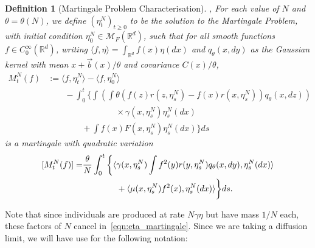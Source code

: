 \documentclass[12pt]{article}
\newtheorem{definition}[theorem]{Definition}
\newcommand{\IR}{\mathbb R}
\newcommand{\meanq}{\vec b}    %
\newcommand{\covq}{C}     %
\newcommand{\measures}{\mathcal{M}_F(\IR^d)} %
\begin{document}
\begin{definition}[Martingale Problem Characterisation]
    \label{defn:mgale_construction},
For each value of $N$ and $\theta = \theta(N)$,
we define $(\eta^N_t)_{t \geq 0}$ to be the solution to the Martingale Problem,
with initial condition $\eta^N_0 \in \measures$,
such that for all smooth functions $f \in C^{\infty}_{0}(\IR^d)$,
writing $\langle f, \eta \rangle = \int_{\IR^d} f(x) \eta(dx)$
and $q_\theta(x, dy)$ as the Gaussian kernel
with mean $x + \meanq(x)/\theta$ and covariance $\covq(x) / \theta$,
\begin{equation}
    \label{eqn:eta_martingale}
\begin{aligned}
M^N_t(f)
&:=  \langle f, \eta^N_t \rangle
        -\langle f, \eta^N_0 \rangle
 \\ &\qquad {}
 -  \int_{0}^{t}\bigg\{
        \int\left( \int \theta
             \left(
                f(z)r(z, \eta^N_{s})
                - f(x)r(x, \eta^N_{s})
            \right)
        q_\theta(x,dz) \right)
\\ & \qquad \qquad \qquad \qquad {}
        \times \gamma(x, \eta^N_{s}) \eta^N_{s}(dx)
\\ & \qquad \qquad {}
    + \int f(x) F(x, \eta^N_{s}) \eta^N_{s}(dx)
    \bigg\} ds
\end{aligned}    
\end{equation}
is a martingale with quadratic variation
    \begin{equation} \label{eqn:prelimit_martingale_variation}
\begin{aligned} \relax
[ M^N_t(f)] =& 
\frac{\theta}{N} \int_{0}^{t}\bigg\{
    \langle \gamma(x, \eta^N_{s})
        \int f^2(y)r(y, \eta^N_{s}) q_\theta(x,dy) 
    , \eta^N_{s}(dx) \rangle \\
& \qquad \qquad {}
    + \langle \mu(x, \eta^N_{s}) f^2(x) 
    , \eta^N_{s}(dx)\rangle
    \bigg\}ds. 
\end{aligned}    
\end{equation}
\end{definition}

Note that
since individuals are produced at rate $N \gamma \eta$ but have mass $1/N$ each,
these factors of $N$ cancel in~\eqref{eqn:eta_martingale}.
Since we are taking a diffusion limit,
we will have use for the following notation:
\end{document}
